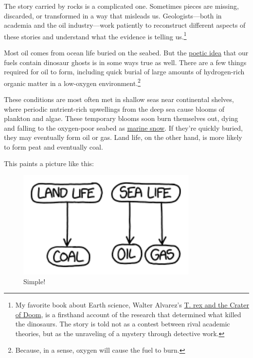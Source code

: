 {{The story carried by rocks is a complicated one. Sometimes pieces are missing, discarded, or transformed in a way that misleads us. Geologists—both in academia and the oil industry—work patiently to reconstruct different aspects of these stories and understand what the evidence is telling us.{\footnote{My favorite book about Earth science, Walter Alvarez's \href{http://www.amazon.com/Crater-Doom-Princeton-Science-Library/dp/0691131031}{T. rex and the Crater of Doom}, is a firsthand account of the research that determined what killed the dinosaurs. The story is told not as a contest between rival academic theories, but as the unraveling of a mystery through detective work.} } }

{Most oil comes from ocean life buried on the seabed. But the \href{http://www.birdandmoon.com/55words/story29.html}{poetic idea} that our fuels contain dinosaur ghosts is in some ways true as well. There are a few things required for oil to form, including quick burial of large amounts of hydrogen-rich organic matter in a low-oxygen environment.{\footnote{Because, in a sense, oxygen will cause the fuel to burn.} } }

{These conditions are most often met in shallow seas near continental shelves, where periodic nutrient-rich upwellings from the deep sea cause blooms of plankton and algae. These temporary blooms soon burn themselves out, dying and falling to the oxygen-poor seabed as \href{https://en.wikipedia.org/wiki/Marine\_snow}{marine snow}. If they're quickly buried, they may eventually form oil or gas. Land life, on the other hand, is more likely to form peat and eventually coal.}

{This paints a picture like this:}

\begin{figure}[!htbp]
\centering
\includegraphics[scale=0.5, max width=0.8\textwidth]{imgs/a/101/cog.png}
\caption{Simple!}
\end{figure}

}

